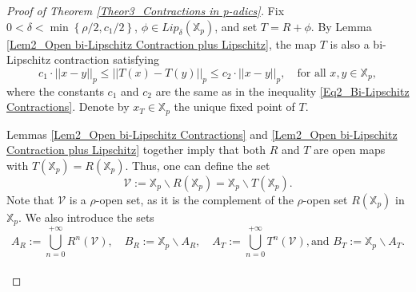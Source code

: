 \documentclass[a4paper, 12pt]{article}
\theoremstyle{definition}
\begin{document}
\begin{proof}[Proof of Theorem \ref{Theor3_Contractions in p-adics}]
		Fix $0  < \delta  <  \min  \left\{  \rho/2, c_{1}/2  \right\} $, $\phi \in Lip_{\delta} \left(  \mathbb{X}_{p}  \right) $, and set $T = R + \phi$. By Lemma \ref{Lem2_Open bi-Lipschitz Contraction plus Lipschitz}, the map $T$ is also a bi-Lipschitz contraction satisfying   
		\begin{equation}\label{Eq3_Contraction T Lower Bound}
			c_{1} \cdot  \left| \left|  x - y  \right|  \right|_{p}   \le    \left| \left|  T(x) - T(y)  \right|  \right|_{p}    \le   c_{2} \cdot  \left| \left|  x - y  \right|  \right|_{p}, \quad \text{for all } x,y \in \mathbb{X}_{p}, 
		\end{equation}
		where the constants $c_{1}$ and $ c_{2} $ are the same as in the inequality \eqref{Eq2_Bi-Lipschitz Contractions}. Denote by $x_{T} \in \mathbb{X}_{p}$ the unique fixed point of $T$. 
		
		Lemmas \ref{Lem2_Open bi-Lipschitz Contractions} and \ref{Lem2_Open bi-Lipschitz Contraction plus Lipschitz} together imply that both $R$ and $T$ are open maps with  $ T \left(  \mathbb{X}_{p}  \right)  = R \left(  \mathbb{X}_{p}  \right)  $. Thus, one can define the set  
		\begin{equation}\label{Eq2_Domain of the Contraction}  
			\mathcal{V} :=    \mathbb{X}_{p} \backslash R \left(  \mathbb{X}_{p}  \right)    =   \mathbb{X}_{p} \backslash T \left(  \mathbb{X}_{p}  \right)  .
		\end{equation}
		Note that $\mathcal{V}$ is a $\rho$-open set, as it is the complement of the $\rho$-open set $R \left(  \mathbb{X}_{p}  \right) $ in $\mathbb{X}_{p}$. 
		We also introduce the sets 
		\begin{equation}\label{Eq2_Contraction Domain B}
			A_{R} :=   \bigcup_{n=0}^{+ \infty } R^{n} \left(  \mathcal{V}  \right) , \quad B_{R} :=   \mathbb{X}_{p} \backslash A_{R}, \quad A_{T} :=   \bigcup_{n=0}^{+ \infty } T^{n} \left(  \mathcal{V}  \right) ,   \text{and }   B_{T} :=   \mathbb{X}_{p} \backslash A_{T}.
		\end{equation}
		
		
		\paragraph{}
		

\end{proof}
\end{document}
